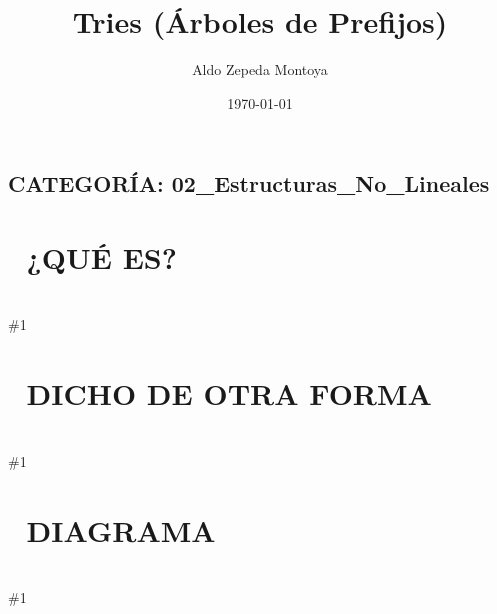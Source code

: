 \documentclass{article}
\newcommand{\quees}[1]{
    \section*{🤔 ¿QUÉ ES?}
    \hrulefill \\
    \#1
}
\newcommand{\dichodeotraforma}[1]{
    \section*{💬 DICHO DE OTRA FORMA}
    \hrulefill \\
    \#1
}
\newcommand{\diagrama}[1]{
    \section*{🎨 DIAGRAMA}
    \hrulefill \\
    \#1
}
\begin{document}
\title{Tries (Árboles de Prefijos)}
\author{Aldo Zepeda Montoya}
\date{\today}
\maketitle

\subsection*{CATEGORÍA: 02\_Estructuras\_No\_Lineales}

\quees{
Un diccionario físico 📖 donde navegas letra por letra. Para buscar
la palabra "GATO":
1. Vas a la sección G.
2. Dentro de G, buscas la A.
3. Dentro de GA, buscas la T.
4. Dentro de GAT, buscas la O.
¡Encontrado!

Cada nivel del árbol representa una letra. Si compartes el mismo
inicio (prefijo), compartes los mismos nodos. Por ejemplo, "GATO" y 
"GOTA" comparten la 'G', pero luego se bifurcan.
}

\dichodeotraforma{
Un Trie (se pronuncia como "try") es un árbol especializado para
guardar strings. Cada nodo representa un caracter. 

Su gran ventaja es la eficiencia para búsquedas de prefijos y 
autocompletado. A diferencia de un Hash Map, el tiempo de búsqueda
en un Trie depende únicamente de la longitud de la palabra (L), no
del número de palabras guardadas (N).
}

\diagrama{\begin{verbatim}
Insertando: "CAT", "CAR", "DO", "DOG"

      [root]
      /    \
    [C]    [D]
     |      |
    [A]    [O]*  <-- "DO" es palabra (isEnd=true)
    / \     |
  [T]*[R]* [G]*  <-- "CAT", "CAR", "DOG" son palabras

* : Indica el final de una palabra (isEnd = true).
\end{verbatim}}
\end{document}
